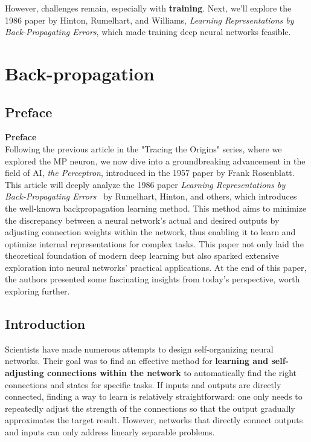 \documentclass[11p,oneside]{book}
\begin{document}
However, challenges remain, especially with \textbf{training}. Next, we’ll explore the 1986 paper by Hinton, Rumelhart, and Williams, \textit{Learning Representations by Back-Propagating Errors}, which made training deep neural networks feasible.

\chapter{Back-propagation}

\section*{Preface}

\textbf{Preface} \\
Following the previous article in the "Tracing the Origins" series, where we explored the MP neuron, we now dive into a groundbreaking advancement in the field of AI, \textit{the Perceptron}, introduced in the 1957 paper by Frank Rosenblatt. This article will deeply analyze the 1986 paper \textit{Learning Representations by Back-Propagating Errors}~\cite{Rumelhart1986} by Rumelhart, Hinton, and others, which introduces the well-known backpropagation learning method. This method aims to minimize the discrepancy between a neural network's actual and desired outputs by adjusting connection weights within the network, thus enabling it to learn and optimize internal representations for complex tasks. This paper not only laid the theoretical foundation of modern deep learning but also sparked extensive exploration into neural networks' practical applications. At the end of this paper, the authors presented some fascinating insights from today's perspective, worth exploring further.

\section*{Introduction}

Scientists have made numerous attempts to design self-organizing neural networks. Their goal was to find an effective method for \textbf{learning and self-adjusting connections within the network} to automatically find the right connections and states for specific tasks. If inputs and outputs are directly connected, finding a way to learn is relatively straightforward: one only needs to repeatedly adjust the strength of the connections so that the output gradually approximates the target result. However, networks that directly connect outputs and inputs can only address linearly separable problems. \\
\end{document}
